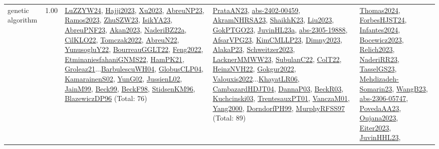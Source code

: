 {\begin{longtable}{p{3cm}r>{\raggedright\arraybackslash}p{6cm}>{\raggedright\arraybackslash}p{6cm}>{\raggedright\arraybackslash}p{8cm}}
\index{genetic algorithm}\index{Algorithms!genetic algorithm}genetic algorithm &  1.00 & \hyperref[detail:LuZZYW24]{LuZZYW24}, \hyperref[detail:Hajji2023]{Hajji2023}, \hyperref[detail:Xu2023]{Xu2023}, \hyperref[detail:AbreuNP23]{AbreuNP23}, \hyperref[detail:Ramos2023]{Ramos2023}, \hyperref[detail:ZhuSZW23]{ZhuSZW23}, \hyperref[detail:IsikYA23]{IsikYA23}, \hyperref[detail:AbreuPNF23]{AbreuPNF23}, \hyperref[detail:Akan2023]{Akan2023}, \hyperref[detail:NaderiBZ22a]{NaderiBZ22a}, \hyperref[detail:CilKLO22]{CilKLO22}, \hyperref[detail:Tomczak2022]{Tomczak2022}, \hyperref[detail:AbreuN22]{AbreuN22}, \hyperref[detail:YunusogluY22]{YunusogluY22}, \hyperref[detail:BourreauGGLT22]{BourreauGGLT22}, \hyperref[detail:Feng2022]{Feng2022}, \hyperref[detail:EtminaniesfahaniGNMS22]{EtminaniesfahaniGNMS22}, \hyperref[detail:HamPK21]{HamPK21}, \hyperref[detail:Groleaz21]{Groleaz21}...\hyperref[detail:BarbulescuWH04]{BarbulescuWH04}, \hyperref[detail:GlobusCLP04]{GlobusCLP04}, \hyperref[detail:KamarainenS02]{KamarainenS02}, \hyperref[detail:YunG02]{YunG02}, \hyperref[detail:JussienL02]{JussienL02}, \hyperref[detail:JainM99]{JainM99}, \hyperref[detail:Beck99]{Beck99}, \hyperref[detail:BeckF98]{BeckF98}, \hyperref[detail:StidsenKM96]{StidsenKM96}, \hyperref[detail:BlazewiczDP96]{BlazewiczDP96} (Total: 76) & \hyperref[detail:PrataAN23]{PrataAN23}, \hyperref[detail:abs-2402-00459]{abs-2402-00459}, \hyperref[detail:AkramNHRSA23]{AkramNHRSA23}, \hyperref[detail:ShaikhK23]{ShaikhK23}, \hyperref[detail:Liu2023]{Liu2023}, \hyperref[detail:GokPTGO23]{GokPTGO23}, \hyperref[detail:JuvinHL23a]{JuvinHL23a}, \hyperref[detail:abs-2305-19888]{abs-2305-19888}, \hyperref[detail:AfsarVPG23]{AfsarVPG23}, \hyperref[detail:KimCMLLP23]{KimCMLLP23}, \hyperref[detail:Dimny2023]{Dimny2023}, \hyperref[detail:AlakaP23]{AlakaP23}, \hyperref[detail:Schweitzer2023]{Schweitzer2023}, \hyperref[detail:LacknerMMWW23]{LacknerMMWW23}, \hyperref[detail:SubulanC22]{SubulanC22}, \hyperref[detail:ColT22]{ColT22}, \hyperref[detail:HeinzNVH22]{HeinzNVH22}, \hyperref[detail:Gokgur2022]{Gokgur2022}, \hyperref[detail:Valouxis2022]{Valouxis2022}...\hyperref[detail:KhayatLR06]{KhayatLR06}, \hyperref[detail:CambazardHDJT04]{CambazardHDJT04}, \hyperref[detail:DannaP03]{DannaP03}, \hyperref[detail:BeckR03]{BeckR03}, \hyperref[detail:Kuchcinski03]{Kuchcinski03}, \hyperref[detail:TrentesauxPT01]{TrentesauxPT01}, \hyperref[detail:VanczaM01]{VanczaM01}, \hyperref[detail:Yang2000]{Yang2000}, \hyperref[detail:DorndorfPH99]{DorndorfPH99}, \hyperref[detail:MurphyRFSS97]{MurphyRFSS97} (Total: 89) & \hyperref[detail:Thomas2024]{Thomas2024}, \hyperref[detail:ForbesHJST24]{ForbesHJST24}, \hyperref[detail:Infantes2024]{Infantes2024}, \hyperref[detail:Bocewicz2023]{Bocewicz2023}, \hyperref[detail:Relich2023]{Relich2023}, \hyperref[detail:NaderiRR23]{NaderiRR23}, \hyperref[detail:TasselGS23]{TasselGS23}, \hyperref[detail:Mehdizadeh-Somarin23]{Mehdizadeh-Somarin23}, \hyperref[detail:WangB23]{WangB23}, \hyperref[detail:abs-2306-05747]{abs-2306-05747}, \hyperref[detail:PovedaAA23]{PovedaAA23}, \hyperref[detail:Oujana2023]{Oujana2023}, \hyperref[detail:Eiter2023]{Eiter2023}, \hyperref[detail:JuvinHHL23]{JuvinHHL23}, 
\end{longtable}}
